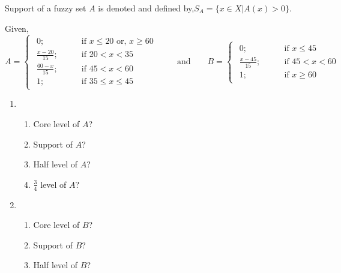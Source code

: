 \documentclass[../main-sheet.tex]{subfiles}
\begin{document}
\begin{defn}
    Support of a fuzzy set \(A\) is denoted and defined by,\(S_A=\{x\in X|A(x)>0\}\).
\end{defn}
\begin{ex}
    Given,
    \[
        A=\begin{cases}
            \begin{aligned}
                0; \qquad&\text{if } x\leq20 \text{ or, }x\geq 60\\
                \frac{x-20}{15}; \qquad&\text{if }20< x<35\\
                \frac{60-x}{15}; \qquad&\text{if }45< x<60\\
                1; \qquad&\text{if }35\leq x\leq 45
            \end{aligned}
    \end{cases}
    \qquad\text{and}\qquad
    B=\begin{cases}
        \begin{aligned}
            0; \qquad&\text{if }x\leq45\\
            \frac{x-45}{15}; \qquad&\text{if }45< x<60\\
            1; \qquad&\text{if }x\geq 60
        \end{aligned}
    \end{cases}
    \]
    \begin{enumerate}
        \item \begin{enumerate}
            \item Core level of \(A \)?
            \item Support of \(A \)?
            \item Half level of \(A \)?
            \item \(\frac{3}{4}\) level of \(A \)?
        \end{enumerate}
        \item \begin{enumerate}
            \item Core level of \(B \)?
            \item Support of \(B \)?
            \item Half level of \(B \)?
        \end{enumerate}
    \end{enumerate}
\end{ex}
\end{document}
